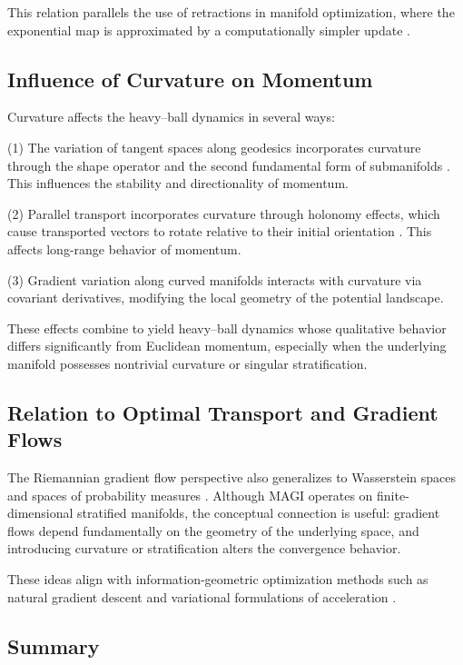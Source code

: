 \documentclass[12pt]{article}
\begin{document}
This relation parallels the use of retractions in manifold optimization, where the exponential map is approximated by a computationally simpler update \citep{Absil2008}.

\subsection*{Influence of Curvature on Momentum}

Curvature affects the heavy–ball dynamics in several ways:

(1) The variation of tangent spaces along geodesics incorporates curvature through the shape operator and the second fundamental form of submanifolds \citep{doCarmoRiemannian1992}. This influences the stability and directionality of momentum.

(2) Parallel transport incorporates curvature through holonomy effects, which cause transported vectors to rotate relative to their initial orientation \citep{Jost2011}. This affects long-range behavior of momentum.

(3) Gradient variation along curved manifolds interacts with curvature via covariant derivatives, modifying the local geometry of the potential landscape.

These effects combine to yield heavy–ball dynamics whose qualitative behavior differs significantly from Euclidean momentum, especially when the underlying manifold possesses nontrivial curvature or singular stratification.

\subsection*{Relation to Optimal Transport and Gradient Flows}

The Riemannian gradient flow perspective also generalizes to Wasserstein spaces and spaces of probability measures \citep{AmbrosioGigliSavaré2008,Villani2009}. Although MAGI operates on finite-dimensional stratified manifolds, the conceptual connection is useful: gradient flows depend fundamentally on the geometry of the underlying space, and introducing curvature or stratification alters the convergence behavior.

These ideas align with information-geometric optimization methods such as natural gradient descent \citep{Amari1998,AmariNagaoka2000} and variational formulations of acceleration \citep{Wibisono2016}.

\subsection*{Summary}
\end{document}
